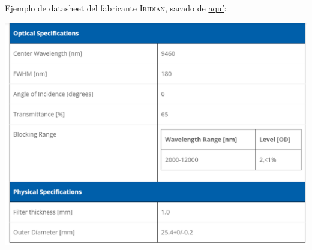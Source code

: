 \documentclass[12pt,dvipsnames]{exam}
\begin{document}
Ejemplo de datasheet del fabricante \textsc{Iridian}, sacado de \href{https://www.iridian.ca/product/bpf-9460-180/}{aquí}:

\begin{center}
	\includegraphics[scale=1.0]{imgs/datasheet_modelo.png}
\end{center}
\end{document}
